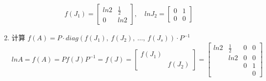 \begin{solution}
\begin{enumerate}
\begin{align*}
                                f(J_1) = \begin{bmatrix}
                                    ln2 & \frac{1}{2} \\ 0 & ln2
                                \end{bmatrix}, \quad lnJ_2 = \begin{bmatrix}
                                    0 & 1 \\ 0 & 0
                                \end{bmatrix}
                            \end{align*}
                        \item 计算 $f(A) = P \cdot diag(f(J_1), \ f(J_2), \ \dots, \ f(J_s)) \cdot P^{-1}$
                            \begin{equation*}
                                lnA = f(A) = Pf(J)P^{-1} = f(J) = \begin{bmatrix}
                                    f(J_1) & \\ & f(J_2) 
                                \end{bmatrix} = \begin{bmatrix}
                                    ln2 & \frac{1}{2} & 0 & 0 \\ & ln2 & 0 & 0 \\ & & 0 & 1 \\ & & & 0
                                \end{bmatrix}
                            \end{equation*}
                            
                        \end{enumerate}
                    \end{solution}